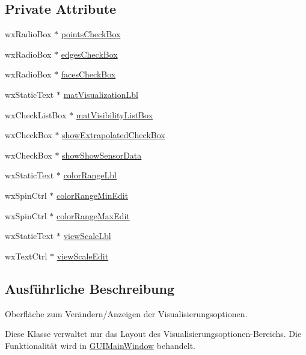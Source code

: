 \subsection*{Private Attribute}
\begin{DoxyCompactItemize}
\item 
wx\-Radio\-Box $\ast$ \hyperlink{classViewpropBox_a706dfcdceaa1afff899f51eb2ebded81}{points\-Check\-Box}
\item 
wx\-Radio\-Box $\ast$ \hyperlink{classViewpropBox_a42925abd6e515ec8f12e9de662edf39e}{edges\-Check\-Box}
\item 
wx\-Radio\-Box $\ast$ \hyperlink{classViewpropBox_ad5b2d4c590f1594ae5b0c80251d80005}{faces\-Check\-Box}
\item 
wx\-Static\-Text $\ast$ \hyperlink{classViewpropBox_a6352cdc6579ed2b9a7cfdd28a847bfec}{mat\-Visualization\-Lbl}
\item 
wx\-Check\-List\-Box $\ast$ \hyperlink{classViewpropBox_a8e6d0646ebdd844f96acde46e63fb74d}{mat\-Visibility\-List\-Box}
\item 
wx\-Check\-Box $\ast$ \hyperlink{classViewpropBox_a26459f6ab8498b578ecf30dcb4fd582e}{show\-Extrapolated\-Check\-Box}
\item 
wx\-Check\-Box $\ast$ \hyperlink{classViewpropBox_a731fabc531998315b0850a3b60eb3c51}{show\-Show\-Sensor\-Data}
\item 
wx\-Static\-Text $\ast$ \hyperlink{classViewpropBox_a562f38091ff255820b63734e7d4b1ff8}{color\-Range\-Lbl}
\item 
wx\-Spin\-Ctrl $\ast$ \hyperlink{classViewpropBox_a64af7732726775603579fedcf231d5e0}{color\-Range\-Min\-Edit}
\item 
wx\-Spin\-Ctrl $\ast$ \hyperlink{classViewpropBox_ab87e9eba3e16969c4423ff0790ccf99c}{color\-Range\-Max\-Edit}
\item 
wx\-Static\-Text $\ast$ \hyperlink{classViewpropBox_ab312348ae97369e3b8a1a7ce8ba9e2b1}{view\-Scale\-Lbl}
\item 
wx\-Text\-Ctrl $\ast$ \hyperlink{classViewpropBox_ae275307ddd3a84c91298e78b826f1ae1}{view\-Scale\-Edit}
\end{DoxyCompactItemize}


\subsection{Ausführliche Beschreibung}
Oberfläche zum Verändern/\-Anzeigen der Visualisierungsoptionen. 

Diese Klasse verwaltet nur das Layout des Visualisierungsoptionen-\/\-Bereichs. Die Funktionalität wird in \hyperlink{classGUIMainWindow}{G\-U\-I\-Main\-Window} behandelt. 


